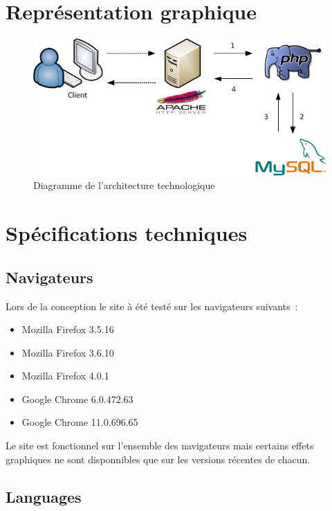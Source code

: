 \documentclass[letter, 11pt]{report}
\begin{document}
\section{Représentation graphique}

\begin{figure}[htbp]
	\begin{center}
		\includegraphics[scale=0.75]{architectureTechnologique.png}
	\end{center}
	\caption{Diagramme de l'architecture technologique}
\end{figure}

\section{Spécifications techniques}


\subsection{Navigateurs}
Lors de la conception le site à été testé sur les navigateurs suivants~:

\begin{itemize}
	\item Mozilla Firefox 3.5.16
	\item Mozilla Firefox 3.6.10
	\item Mozilla Firefox 4.0.1
	\item Google Chrome 6.0.472.63
	\item Google Chrome 11.0.696.65
\end{itemize}

Le site est fonctionnel sur l'ensemble des navigateurs mais certains effets graphiques ne sont disponnibles que sur les versions récentes de chacun.

\subsection{Languages}
\end{document}
